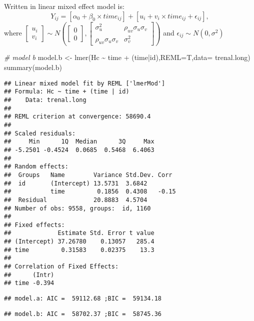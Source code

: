 \documentclass[
]{article}
\newenvironment{Shaded}{\begin{snugshade}}{\end{snugshade}}
\newcommand{\AttributeTok}[1]{\textcolor[rgb]{0.77,0.63,0.00}{#1}}
\newcommand{\CommentTok}[1]{\textcolor[rgb]{0.56,0.35,0.01}{\textit{#1}}}
\newcommand{\FunctionTok}[1]{\textcolor[rgb]{0.00,0.00,0.00}{#1}}
\newcommand{\NormalTok}[1]{#1}
\newcommand{\OtherTok}[1]{\textcolor[rgb]{0.56,0.35,0.01}{#1}}
\newcommand{\SpecialCharTok}[1]{\textcolor[rgb]{0.00,0.00,0.00}{#1}}
\begin{document}
Written in linear mixed effect model is:
\[Y_{ij} = [\alpha_0 + \beta_0 \times time_{ij}] + [ u_i + v_i \times time_{ij} +  \epsilon_{ij} ],\]
where
\(\begin{bmatrix} u_i \\ v_i \end{bmatrix} \sim N\left(\begin{bmatrix} 0 \\ 0 \end{bmatrix}, \begin{bmatrix}\sigma_{u}^2 & \rho_{uv}\sigma_u\sigma_v \\ \rho_{uv} \sigma_u\sigma_v & \sigma_v^2 \end{bmatrix}\right)\)
and \(\epsilon_{ij} \sim N(0,\sigma^2)\)

\begin{Shaded}
\begin{Highlighting}[]
\CommentTok{\# model b}
\NormalTok{model.b }\OtherTok{\textless{}{-}} \FunctionTok{lmer}\NormalTok{(Hc }\SpecialCharTok{\textasciitilde{}}\NormalTok{ time }\SpecialCharTok{+}\NormalTok{ (time}\SpecialCharTok{|}\NormalTok{id),}\AttributeTok{REML=}\NormalTok{T,}\AttributeTok{data=}\NormalTok{ trenal.long)}
\FunctionTok{summary}\NormalTok{(model.b)}
\end{Highlighting}
\end{Shaded}

\begin{verbatim}
## Linear mixed model fit by REML ['lmerMod']
## Formula: Hc ~ time + (time | id)
##    Data: trenal.long
## 
## REML criterion at convergence: 58690.4
## 
## Scaled residuals: 
##     Min      1Q  Median      3Q     Max 
## -5.2501 -0.4524  0.0685  0.5468  6.4063 
## 
## Random effects:
##  Groups   Name        Variance Std.Dev. Corr 
##  id       (Intercept) 13.5731  3.6842        
##           time         0.1856  0.4308   -0.15
##  Residual             20.8883  4.5704        
## Number of obs: 9558, groups:  id, 1160
## 
## Fixed effects:
##             Estimate Std. Error t value
## (Intercept) 37.26780    0.13057   285.4
## time         0.31583    0.02375    13.3
## 
## Correlation of Fixed Effects:
##      (Intr)
## time -0.394
\end{verbatim}

\begin{verbatim}
## model.a: AIC =  59112.68 ;BIC =  59134.18
\end{verbatim}

\begin{verbatim}
## model.b: AIC =  58702.37 ;BIC =  58745.36
\end{verbatim}
\end{document}

